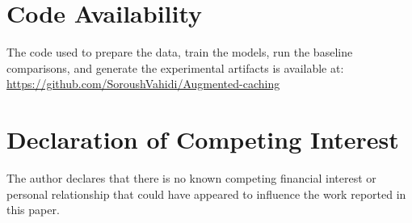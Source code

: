 \documentclass[preprint,12pt]{elsarticle}
\begin{document}
\section*{Code Availability}

The code used to prepare the data, train the models, run the baseline comparisons, and generate the experimental artifacts is available at:
\url{https://github.com/SoroushVahidi/Augmented-caching}

\section*{Declaration of Competing Interest}

The author declares that there is no known competing financial interest or personal relationship that could have appeared to influence the work reported in this paper.




\end{document}
